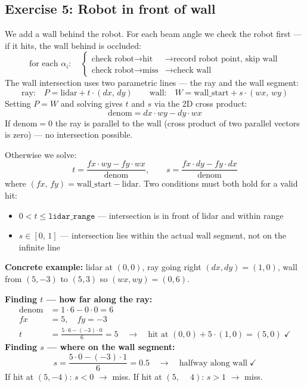 \documentclass[12pt, a4paper]{article}
\begin{document}
\vspace{-0.6cm}
\subsection*{Exercise 5: Robot in front of wall}
\vspace{-0.3cm}
We add a wall behind the robot. For each beam angle we check the robot first
--- if it hits, the wall behind is occluded:
\[
  \text{for each } \alpha_i: \quad
  \begin{cases}
    \text{check robot} \rightarrow \text{hit} & \rightarrow \text{record robot point, skip wall}\\
    \text{check robot} \rightarrow \text{miss} & \rightarrow \text{check wall}
  \end{cases}
\]
The wall intersection uses two parametric lines --- the ray and the wall segment:
\[
  \text{ray:} \quad P = \text{lidar} + t\cdot(dx,\,dy)
  \qquad
  \text{wall:} \quad W = \text{wall\_start} + s\cdot(wx,\,wy)
\]
Setting $P = W$ and solving gives $t$ and $s$ via the 2D cross product:
\[
  \text{denom} = dx\cdot wy - dy\cdot wx
\]
If $\text{denom} = 0$ the ray is parallel to the wall (cross product of two
parallel vectors is zero) --- no intersection possible. 

Otherwise we solve:
\[
  t = \frac{fx\cdot wy - fy\cdot wx}{\text{denom}}, \qquad
  s = \frac{fx\cdot dy - fy\cdot dx}{\text{denom}}
\]
where $(fx,\,fy) = \text{wall\_start} - \text{lidar}$.
Two conditions must both hold for a valid hit:
\begin{itemize}[leftmargin=1.4em]
  \item $0 < t \leq \texttt{lidar\_range}$ --- intersection is in front of lidar and within range
  \item $s \in [0,\,1]$ --- intersection lies within the actual wall segment, not on the infinite line
\end{itemize}

\begin{notebox}
  \textbf{Concrete example:} lidar at $(0,0)$, ray going right $(dx,dy)=(1,0)$,
  wall from $(5,-3)$ to $(5,3)$ so $(wx,wy)=(0,6)$.

  \textbf{Finding $t$ --- how far along the ray:}
  \[
  \begin{aligned}
    \text{denom} &= 1\cdot6 - 0\cdot0 = 6 \\
    fx &= 5,\quad fy = -3\\
    t &= \frac{5\cdot6 - (-3)\cdot0}{6} = 5
    \quad\rightarrow\quad \text{hit at }(0,0)+5\cdot(1,0) = (5,0) \;\checkmark
  \end{aligned}
  \]
  \textbf{Finding $s$ --- where on the wall segment:}
  \[
    s = \frac{5\cdot0 - (-3)\cdot1}{6} = 0.5
    \quad\rightarrow\quad \text{halfway along wall} \;\checkmark
  \]
  If hit at $(5,-4)$: $s < 0$ $\rightarrow$ miss.\quad
  If hit at $(5,\phantom{-}4)$: $s > 1$ $\rightarrow$ miss.
\end{notebox}
\end{document}
